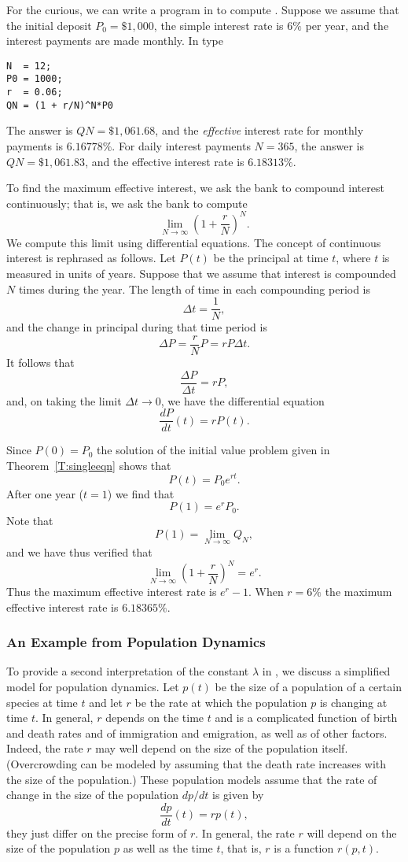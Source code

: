 For the curious, we can write a program in \Matlab to compute
.  Suppose we assume that the initial deposit $P_0=\$1,000$,
the simple interest rate is $6\%$ per year, and the interest payments
are made monthly. In \Matlab type
\begin{verbatim}
N  = 12;
P0 = 1000;
r  = 0.06;
QN = (1 + r/N)^N*P0
\end{verbatim}
The answer is $QN=\$1,061.68$, and the {\em effective\/}
interest rate for monthly payments is $6.16778\%$.  For daily
interest payments $N=365$, the answer is $QN=\$1,061.83$, and
the effective interest rate is $6.18313\%$.

To find the maximum effective interest, we ask the bank to compound interest
continuously; that is, we ask the bank to compute
\[
\lim_{N\to\infty} \left(1 + \frac{r}{N}\right)^N.
\]
We compute this limit using differential equations.  The concept of
continuous interest is rephrased as follows.  Let $P(t)$ be the
principal at time $t$, where $t$ is measured in units of years.
Suppose that we assume that interest is compounded $N$ times during
the year.  The length of time in each compounding period is
\[
\Delta t = \frac{1}{N},
\]
and the change in principal during that time period is
\[
\Delta P = \frac{r}{N} P = rP\Delta t.
\]
It follows that
\[
\frac{\Delta P}{\Delta t} = rP,
\]
and, on taking the limit $\Delta t \to 0$, we have the differential equation
\[
\frac{dP}{dt}(t) = rP(t).
\]

Since $P(0)=P_0$ the solution of the initial value problem given
in Theorem~\ref{T:singleeqn} shows that
\[
P(t) = P_0 e^{rt}.
\]
After one year ($t=1$) we find that
\[
P(1) =  e^r P_0.
\]
Note that
\[
P(1) = \lim_{N\to\infty} Q_N,
\]
and we have thus verified that
\[
 \lim_{N\to\infty} \left(1 + \frac{r}{N}\right)^N = e^r.
\]
Thus the maximum effective interest rate is $e^r-1$.  When $r=6\%$
the maximum effective interest rate is $6.18365\%$.


\subsubsection*{An Example from Population Dynamics}

To provide a second interpretation of the constant $\lambda$ in
, we discuss a simplified model for population dynamics.
Let $p(t)$ be the size of a population of a certain species at
time $t$ and let $r$ be the rate at which the population $p$ is
changing at time $t$.  In general, $r$ depends on the time $t$
and is a complicated function of birth and death rates and of
immigration and emigration, as well as of other factors.
Indeed, the rate $r$ may well depend
on the size of the population itself.  (Overcrowding can be
modeled by assuming that the death rate increases with the size
of the population.) These population models assume that the
rate of change in the size of the population $dp/dt$ is given by
\begin{equation}  \label{pop_model}
        \frac{dp}{dt}(t) = r p(t),
\end{equation}
they just differ on the precise form of $r$.  In general, the
rate $r$ will depend on the size of the population $p$ as well
as the time $t$, that is, $r$ is a function $r(p,t)$.

